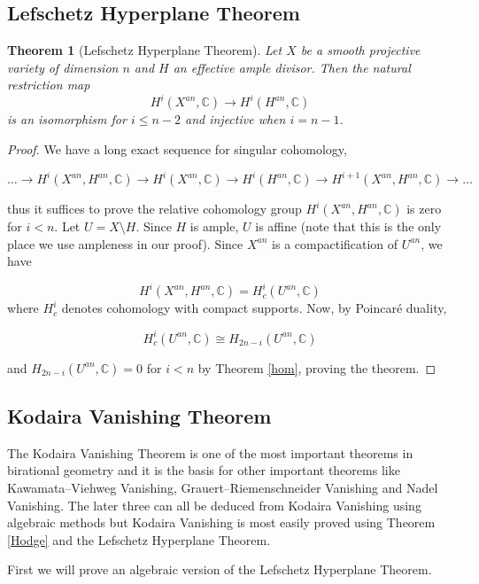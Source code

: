 \documentclass[a4paper]{article}
\newcommand{\C}{\mathbb{C}}
\newtheorem{theorem}{Theorem}
\numberwithin{theorem}{section}
\numberwithin{equation}{section}
\begin{document}
\subsection{Lefschetz Hyperplane Theorem}

\begin{theorem}[Lefschetz Hyperplane Theorem]
    Let $X$ be a smooth projective variety of dimension $n$ and $H$ an effective ample divisor. Then the natural restriction map
    $$ H^i(X^{an},\C) \rightarrow H^i(H^{an},\C) $$
    is an isomorphism for $i \leq n-2$ and injective when $i = n-1$.
\end{theorem}

\begin{proof}
    We have a long exact sequence for singular cohomology,

    $$ \dots \rightarrow H^i(X^{an},H^{an},\C) \rightarrow H^i(X^{an},\C) \rightarrow H^i(H^{an},\C) \rightarrow H^{i+1}(X^{an},H^{an},\C) \rightarrow \dots $$

    thus it suffices to prove the relative cohomology group $H^i(X^{an},H^{an},\C)$ is zero for $i < n$. Let $U = X \setminus H$. Since $H$ is ample, $U$ is affine (note that this is the only place we use ampleness in our proof). Since $X^{an}$ is a compactification of $U^{an}$, we have

    $$ H^i(X^{an},H^{an},\C) = H^i_c(U^{an},\C) $$
    where $H^i_c$ denotes cohomology with compact supports. Now, by Poincaré duality,

    $$ H^i_c(U^{an},\C) \cong H_{2n-i}(U^{an},\C) $$

    and $H_{2n-i}(U^{an},\C) = 0$ for $i < n$ by Theorem \ref{hom}, proving the theorem.
    
\end{proof}

\subsection{Kodaira Vanishing Theorem}

The Kodaira Vanishing Theorem is one of the most important theorems in birational geometry and it is the basis for other important theorems like Kawamata–Viehweg Vanishing, Grauert–Riemenschneider Vanishing and Nadel Vanishing. The later three can all be deduced from Kodaira Vanishing using algebraic methods but Kodaira Vanishing is most easily proved using Theorem \ref{Hodge} and the Lefschetz Hyperplane Theorem.

First we will prove an algebraic version of the Lefschetz Hyperplane Theorem.
\end{document}
